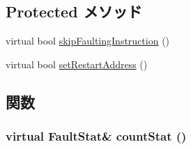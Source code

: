 \subsection*{Protected メソッド}
\begin{DoxyCompactItemize}
\item 
virtual bool \hyperlink{classAlphaISA_1_1AlphaFault_a5d44c6b9ce6041b3e9235e8d978156cb}{skipFaultingInstruction} ()
\item 
virtual bool \hyperlink{classAlphaISA_1_1AlphaFault_a5187b0d322a9546c3eb0ce51f3268f4e}{setRestartAddress} ()
\end{DoxyCompactItemize}


\subsection{関数}
\hypertarget{classAlphaISA_1_1AlphaFault_a5d92ccd11b5cd6b04f02bd0a088b776c}{
\subsubsection[{countStat}]{\setlength{\rightskip}{0pt plus 5cm}virtual {\bf FaultStat}\& countStat ()}}
\label{classAlphaISA_1_1AlphaFault_a5d92ccd11b5cd6b04f02bd0a088b776c}


